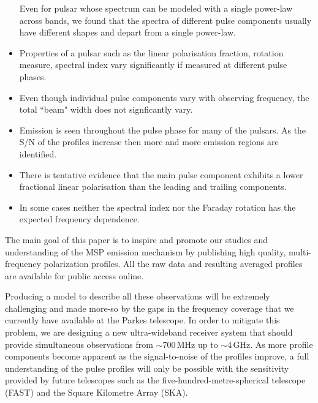 \documentclass[useAMS,usenatbib]{mn2e}
\begin{document}
\begin{itemize}
	Even for pulsar whose spectrum can be modeled with a single power-law across bands, we found that 
	the spectra of different pulse components usually have different shapes and depart from a single 
	power-law. 

\item Properties of a pulsar such as the linear polarisation fraction, rotation measure, spectral index 
	vary significantly if measured at different pulse phases.
\item Even though individual pulse components vary with observing frequency, the total ``beam" width does not signficantly vary.
\item Emission is seen throughout the pulse phase for many of the pulsars. As the S/N of the profiles 
	increase then more and more emission regions are identified.
\item There is tentative evidence that the main pulse component exhibits a lower fractional 
	linear polarisation than the leading and trailing components.
\item In some cases neither the spectral index nor the Faraday rotation has the expected frequency dependence.
\end{itemize}

%
The main goal of this paper is to inspire and promote our studies and understanding 
of the MSP emission mechanism by publishing high quality, multi-frequency 
polarization profiles.
%
All the raw data and resulting averaged profiles are available for 
public access online.
%

Producing a model to describe all these observations will be extremely 
challenging and made more-so by the gaps in the frequency coverage that we 
currently have available at the Parkes telescope.  
%
In order to mitigate this problem, we are designing a new ultra-wideband 
receiver system that should provide simultaneous observations from $\sim700$\,MHz 
up to $\sim4$\,GHz.  
%
As more profile components become apparent as the signal-to-noise of the profiles 
improve, a full understanding of the pulse profiles will only be possible with 
the sensitivity provided by future telescopes such as the five-hundred-metre-spherical 
telescope (FAST) and the Square Kilometre Array (SKA).


%
\end{document}
